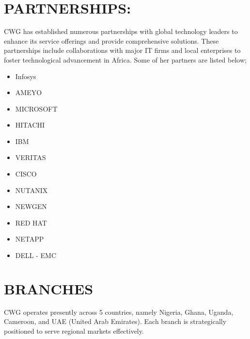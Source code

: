 \documentclass[a4paper,12pt]{report}
\begin{document}
\section[partners]{PARTNERSHIPS:} CWG has established numerous partnerships with global technology leaders to enhance its service offerings and provide comprehensive solutions. These partnerships include collaborations with major IT firms and local enterprises to foster technological advancement in Africa. Some of her partners are listed below;
\begin{itemize}
    \item Infosys
    \item AMEYO
    \item MICROSOFT
    \item HITACHI
    \item IBM
    \item VERITAS
    \item CISCO
    \item NUTANIX
    \item NEWGEN
    \item RED HAT
    \item NETAPP
    \item DELL - EMC
\end{itemize}

\section[Branches]{BRANCHES}
CWG operates presently across 5 countries, namely Nigeria, Ghana, Uganda, Cameroon, and UAE (United Arab Emirates). Each branch is strategically positioned to serve regional markets effectively.
\end{document}
